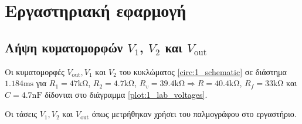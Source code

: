 
\section{Εργαστηριακή εφαρμογή}

	\subsection{Λήψη κυματομορφών $V_1$, $V_2$ και $V_{\mathrm{out}}$}
		Οι κυματομορφές $V_{\mathrm{out}}, V_1$ και $V_2$ του κυκλώματος \ref{circ:1_schematic} σε διάστημα  $1.184\unit{\milli\second}$ για $R_1=47\unit{\kilo\ohm}$, $R_2=4.7\unit{\kilo\ohm}$, $R_v=39.4\unit{\kilo\ohm}\Rightarrow R=40.4\unit{\kilo\ohm}$, $R_f=33\unit{\kilo\ohm}$ και $C=4.7\unit{\nano\farad}$ δίδονται στο διάγραμμα \ref{plot:1_lab_voltages}.

		\begin{chart}[H]
			\begin{center}
				
				\caption{Οι τάσεις $V_1, V_2$ και $V_{\mathrm{out}}$ όπως μετρήθηκαν χρήσει του παλμογράφου στο εργαστήριο.}
				\label{plot:1_lab_voltages}
			\end{center}
		\end{chart}